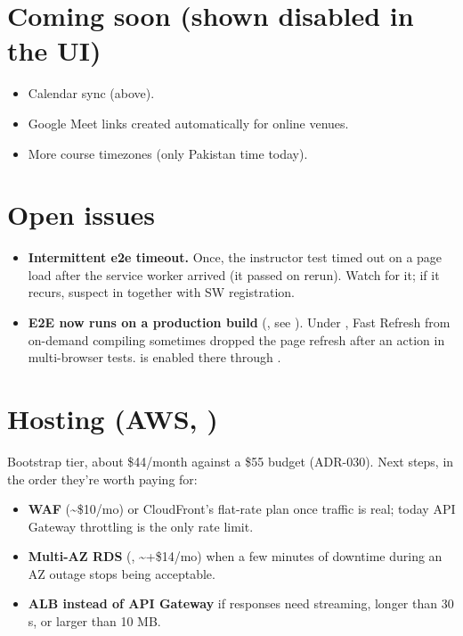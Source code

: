 \section{Coming soon (shown disabled in the UI)}

\begin{itemize}
  \item Calendar sync (above).
  \item Google Meet links created automatically for online venues.
  \item More course timezones (only Pakistan time today).
\end{itemize}

\section{Open issues}

\begin{itemize}
  \item \textbf{Intermittent e2e timeout.} Once, the instructor test timed out on a page load after the service worker arrived (it passed on rerun). Watch for it; if it recurs, suspect  in  together with SW registration.
  \item \textbf{E2E now runs on a production build} (, see ). Under , Fast Refresh from on-demand compiling sometimes dropped the page refresh after an action in multi-browser tests.  is enabled there through .
\end{itemize}

\section[Hosting (AWS, \texttt{infra/aws})]{Hosting (AWS, )}

Bootstrap tier, about \$44/month against a \$55 budget (ADR-030). Next steps, in the order they're worth paying for:
\begin{itemize}
  \item \textbf{WAF} (\textasciitilde{}\$10/mo) or CloudFront's flat-rate plan once traffic is real; today API Gateway throttling is the only rate limit.
  \item \textbf{Multi-AZ RDS} (, \textasciitilde{}+\$14/mo) when a few minutes of downtime during an AZ outage stops being acceptable.
  \item \textbf{ALB instead of API Gateway} if responses need streaming, longer than 30 s, or larger than 10 MB.
\end{itemize}

